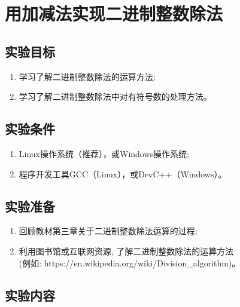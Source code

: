 
\chapter{用加减法实现二进制整数除法}

\section{实验目标}

\begin{enumerate}
	\item 学习了解二进制整数除法的运算方法;
	\item 学习了解二进制整数除法中对有符号数的处理方法。
\end{enumerate}

\section{实验条件}

\begin{enumerate}
	\item Linux操作系统（推荐），或Windows操作系统;
	\item 程序开发工具GCC（Linux），或DevC++（Windows）。
\end{enumerate}

\section{实验准备}

\begin{enumerate}
	\item 回顾教材第三章关于二进制整数除法运算的过程;
	\item 利用图书馆或互联网资源, 了解二进制整数除法的运算方法\\
		(例如: https://en.wikipedia.org/wiki/Division\_algorithm)。
\end{enumerate}

\section{实验内容}

